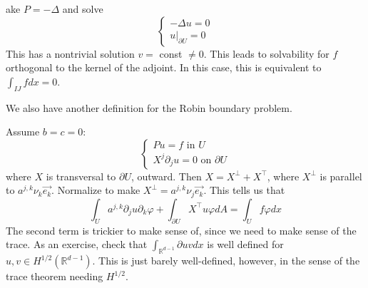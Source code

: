 \begin{example}
ake $P=-\Delta$ and solve
$$
\left\{\begin{array}{l}
-\Delta u=0 \\
\left.u\right|_{\partial U}=0
\end{array}\right.
$$
This has a nontrivial solution $v=$ const $\neq 0$.
This leads to solvability for $f$ orthogonal to the kernel of the adjoint. In this case, this is equivalent to $\int_{I J} f d x=0$.
\end{example}
We also have another definition for the Robin boundary problem. 


\begin{example}
\label{eg: Oblique Dirichlet boundary condition}
Assume $b=c=0:$
$$
\left\{\begin{array}{l}
P u=f \text { in } U \\
X^{j} \partial_{j} u=0 \text { on } \partial U
\end{array}\right.
$$
where $X$ is transversal to $\partial U$, outward. Then $X=X^{\perp}+X^{\top}$, where $X^{\perp}$ is parallel to $a^{j, k} \nu_{k} \overrightarrow{e_{k}}$. Normalize to make $X^{\perp}=a^{j, k} \nu_{j} \overrightarrow{e_{k}}$. This tells us that
$$
\int_{U} a^{j, k} \partial_{j} u \partial_{k} \varphi+\int_{\partial U} X^{\top} u \varphi d A=\int_{U} f \varphi d x
$$
The second term is trickier to make sense of, since we need to make sense of the trace. As an exercise, check that $\int_{\mathbb{R}^{d-1}} \partial u v d x$ is well defined for $u, v \in H^{1 / 2}\left(\mathbb{R}^{d-1}\right)$. This is just barely well-defined, however, in the sense of the trace theorem needing $H^{1 / 2}$.
\end{example}

